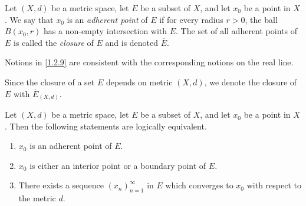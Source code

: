 \begin{defn}[Closure]\label{1.2.9}
  Let \((X, d)\) be a metric space, let \(E\) be a subset of \(X\), and let \(x_0\) be a point in \(X\).
  We say that \(x_0\) is an \emph{adherent point} of \(E\) if for every radius \(r > 0\), the ball \(B(x_0, r)\) has a non-empty intersection with \(E\).
  The set of all adherent points of \(E\) is called the \emph{closure} of \(E\) and is denoted \(\overline{E}\).
\end{defn}

\begin{note}
  Notions in \cref{1.2.9} are consistent with the corresponding notions on the real line.
\end{note}

\begin{note}
  Since the closure of a set \(E\) depends on metric \((X, d)\), we denote the closure of \(E\) with \(\overline{E}_{(X, d)}\).
\end{note}

\begin{prop}\label{1.2.10}
  Let \((X, d)\) be a metric space, let \(E\) be a subset of \(X\), and let \(x_0\) be a point in \(X\).
  Then the following statements are logically equivalent.
  \begin{enumerate}
    \item \(x_0\) is an adherent point of \(E\).
    \item \(x_0\) is either an interior point or a boundary point of \(E\).
    \item There exists a sequence \((x_n)_{n = 1}^\infty\) in \(E\) which converges to \(x_0\) with respect to the metric \(d\).
  \end{enumerate}
\end{prop}

